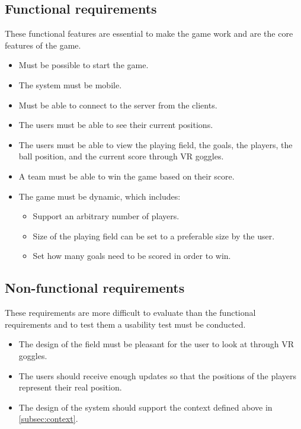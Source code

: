 \subsection{Functional requirements}
These functional features are essential to make the game work and are the core features of the game.

\begin{itemize}
    \item Must be possible to start the game.
    \item The system must be mobile.
    \item Must be able to connect to the server from the clients.
    \item The users must be able to see their current positions.
    \item The users must be able to view the playing field, the goals, the players, the ball position, and the current score through VR goggles.
    \item A team must be able to win the game based on their score.
    \item The game must be dynamic, which includes:
          \begin{itemize}
              \item Support an arbitrary number of players.
              \item Size of the playing field can be set to a preferable size by the user.
              \item Set how many goals need to be scored in order to win.
          \end{itemize}
\end{itemize}

\subsection{Non-functional requirements}
These requirements are more difficult to evaluate than the functional requirements and to test them a usability test must be conducted.
\begin{itemize}
    \item The design of the field must be pleasant for the user to look at through VR goggles.
    \item The users should receive enough updates so that the positions of the players represent their real position.
    \item The design of the system should support the context defined above in \autoref{subsec:context}.
\end{itemize}
